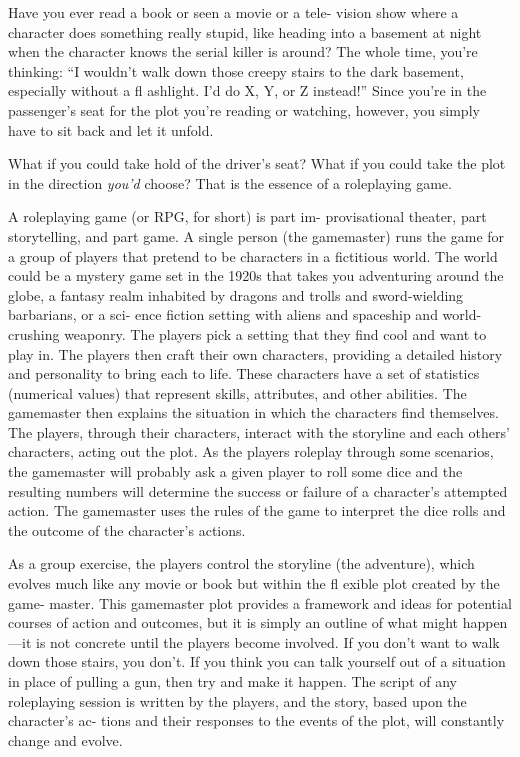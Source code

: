 Have you ever read a book or seen a movie or a tele-
vision show where a character does something really 
stupid, like heading into a basement at night when the 
character knows the serial killer is around? The whole 
time, you're thinking: ``I wouldn't walk down those 
creepy stairs to the dark basement, especially without a 
fl ashlight. I'd do X, Y, or Z instead!'' Since you're in the 
passenger's seat for the plot you're reading or watching, 
however, you simply have to sit back and let it unfold. 

What if you could take hold of the driver's seat? 
What if you could take the plot in the direction \textit{you'd} 
choose? That is the essence of a roleplaying game.

A roleplaying game (or RPG, for short) is part im-
provisational theater, part storytelling, and part game. 
A single person (the gamemaster) runs the game for 
a group of players that pretend to be characters in a 
fictitious world. The world could be a mystery game 
set in the 1920s that takes you adventuring around 
the globe, a fantasy realm inhabited by dragons 
and trolls and sword-wielding barbarians, or a sci-
ence fiction setting with aliens and spaceship and 
world-crushing weaponry. The players pick a setting 
that they find cool and want to play in. The players 
then craft their own characters, providing a detailed 
history and personality to bring each to life. These 
characters have a set of statistics (numerical values) 
that represent skills, attributes, and other abilities. 
The gamemaster then explains the situation in which 
the characters find themselves. The players, through 
their characters, interact with the storyline and each 
others' characters, acting out the plot. As the players 
roleplay through some scenarios, the gamemaster will 
probably ask a given player to roll some dice and the 
resulting numbers will determine the success or failure 
of a character's attempted action. The gamemaster 
uses the rules of the game to interpret the dice rolls 
and the outcome of the character's actions.

As a group exercise, the players control the storyline 
(the adventure), which evolves much like any movie or 
book but within the fl exible plot created by the game-
master. This gamemaster plot provides a framework 
and ideas for potential courses of action and outcomes, 
but it is simply an outline of what might happen—it 
is not concrete until the players become involved. If 
you don't want to walk down those stairs, you don't. 
If you think you can talk yourself out of a situation 
in place of pulling a gun, then try and make it happen. 
The script of any roleplaying session is written by the 
players, and the story, based upon the character's ac-
tions and their responses to the events of the plot, will 
constantly change and evolve.

